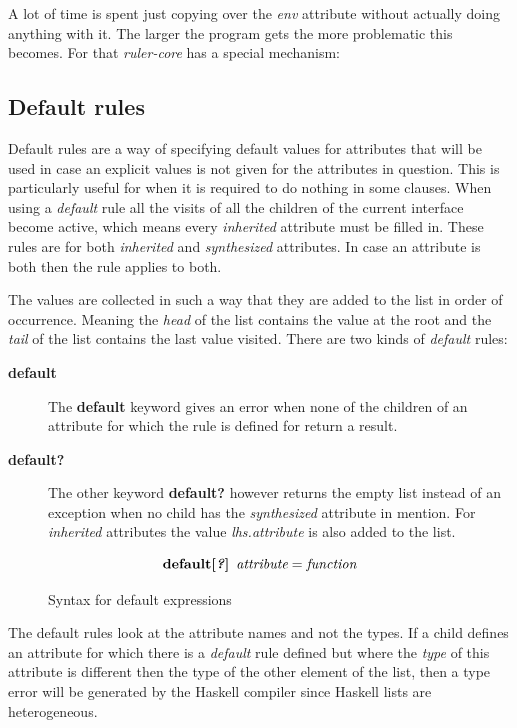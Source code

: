 \documentclass[twoside, titlepage, openright, a4paper]{book}
\newcommand{\rcore}{\emph{ruler-core }}
\begin{document}
A lot of time is spent just copying over the \emph{env} attribute without actually doing anything with it. The larger the program gets the more problematic this becomes. For that \rcore has a special mechanism:

\subsection{Default rules}
Default rules are a way of specifying default values for attributes that will be used in case an explicit values is not given for the attributes in question. This is particularly useful for when it is required to do nothing in some clauses.
When using a \emph{default} rule all the visits of all the children of the current interface become active, which means every \emph{inherited} attribute must be filled in.
These rules are for both \emph{inherited} and \emph{synthesized} attributes. In case an attribute is both then the rule applies to both. 

The values are collected in such a way that they are added to the list in order of occurrence. Meaning the \emph{head} of the list contains the value at the root and the \emph{tail} of the list contains the last value visited. There are two kinds of \emph{default} rules:
\begin{description}
\item[\textbf{default}] { The \textbf{default} keyword gives an error when none of the children of an attribute for which the rule is defined for return a result. }
\item[\textbf{default?}] { The other keyword \textbf{default?} however returns the empty list instead of an exception when no child has the \emph{synthesized} attribute in mention. For \emph{inherited} attributes the value \emph{lhs.attribute} is also added to the list. }
\end{description}

\begin{figure}[h!]
\[
\textbf{default[\textit{?}]} \hspace{5pt} \emph{attribute} = \emph{function}
\]
\caption{Syntax for default expressions}
\label{default:syntax}
\end{figure}

The default rules look at the attribute names and not the types. If a child defines an attribute for which there is a \emph{default} rule defined but where the \emph{type} of this attribute is different then the type of the other element of the list, then a type error will be generated by the Haskell compiler since Haskell lists are heterogeneous.
\end{document}
